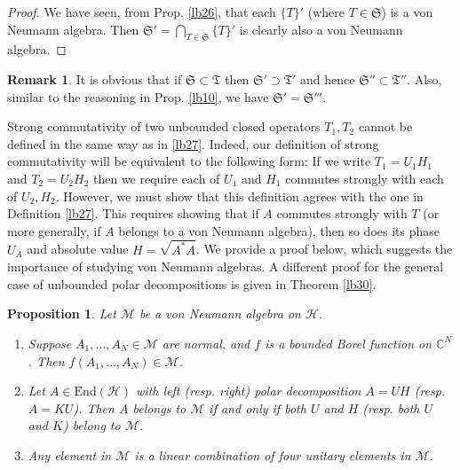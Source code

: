 \documentclass[12pt,a4paper,notitlepage]{article}
\theoremstyle{definition}
\newtheorem{rem}[df]{Remark}
\theoremstyle{plain}
\newtheorem{pp}[df]{Proposition}
\newcommand{\fk}{\mathfrak}
\newcommand{\mc}{\mathcal}
\newcommand{\End}{\mathrm{End}} %
\newcommand{\Cbb}{\mathbb C}
\numberwithin{equation}{section}
\begin{document}
\begin{proof}
We have seen, from Prop. \ref{lb26}, that each $\{T\}'$ (where $T\in\fk S$)  is a von Neumann algebra. Then $\fk S'=\bigcap_{T\in\fk S}\{T\}'$ is clearly also a von Neumann algebra.
\end{proof}

\begin{rem}
It is obvious that if $\fk S\subset\fk T$ then $\fk S'\supset\fk T'$ and hence $\fk S''\subset\fk T''$. Also, similar to the reasoning in Prop. \ref{lb10}, we have $\fk S'=\fk S'''$.
\end{rem}



Strong commutativity of two unbounded closed operators $T_1,T_2$ cannot be defined in the same way as in \ref{lb27}. Indeed, our definition of strong commutativity will be equivalent to the following form: If we write $T_1=U_1H_1$ and $T_2=U_2H_2$ then we require each of $U_1$ and $H_1$ commutes strongly with each of $U_2,H_2$. However, we must show that this definition agrees with the one in Definition \ref{lb27}. This requires showing that if $A$ commutes strongly with $T$ (or more generally, if $A$ belongs to a von Neumann algebra), then so does its phase $U_A$ and absolute value $H=\sqrt{A^*A}$. We provide a proof below, which suggests the importance of studying von Neumann algebras. A different proof for the general case of unbounded polar decompositions is given in Theorem \ref{lb30}.


\begin{pp}\label{lb29}
Let $\mc M$ be a von Neumann algebra on $\mc H$.
\begin{enumerate}
\item Suppose $A_1,\dots,A_N\in\mc M$ are normal, and $f$ is a bounded Borel function on $\Cbb^N$. Then $f(A_1,\dots,A_N)\in\mc M$. 
\item Let $A\in\End(\mc H)$ with left (resp. right) polar decomposition $A=UH$ (resp. $A=KU$). Then $A$ belongs to $\mc M$ if and only if both $U$ and $H$ (resp. both $U$ and $K$)  belong to $\mc M$.
\item Any element in $\mc M$ is a linear combination of four unitary elements in $\mc M$.
\end{enumerate}
\end{pp}
\end{document}
